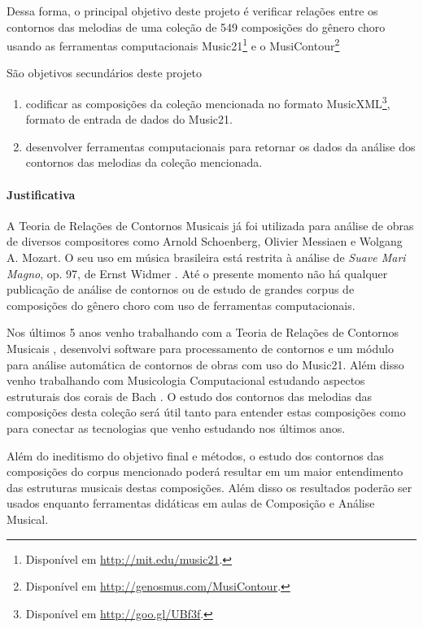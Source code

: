 \documentclass[11pt]{article}
\newcommand{\opus}[1]{\textit{#1}}
\begin{document}
Dessa forma, o principal objetivo deste projeto é verificar relações
entre os contornos das melodias de uma coleção de 549 composições do
gênero choro usando as ferramentas computacionais
Music21\footnote{Disponível em \url{http://mit.edu/music21}.} e o
MusiContour\footnote{Disponível em
  \url{http://genosmus.com/MusiContour}.}

São objetivos secundários deste projeto
\begin{enumerate}
\item codificar as composições da coleção mencionada no formato
  MusicXML\footnote{Disponível em \url{http://goo.gl/UBf3f}.}, formato
  de entrada de dados do Music21.
\item desenvolver ferramentas computacionais para retornar os dados da
  análise dos contornos das melodias da coleção mencionada.
\end{enumerate}

\paragraph{Justificativa}
\label{sec:justificativa}

A Teoria de Relações de Contornos Musicais já foi utilizada para
análise de obras de diversos compositores como Arnold Schoenberg,
Olivier Messiaen e Wolgang A. Mozart. O seu uso em música brasileira
está restrita à análise de \opus{Suave Mari Magno}, op. 97, de Ernst
Widmer \cite{Thiesen2005}. Até o presente momento não há qualquer
publicação de análise de contornos ou de estudo de grandes corpus de
composições do gênero choro com uso de ferramentas computacionais.

Nos últimos 5 anos venho trabalhando com a Teoria de Relações de
Contornos Musicais \cite{Sampaio2008}, desenvolvi software para
processamento de contornos e um módulo para análise automática de
contornos de obras com uso do Music21.
Além disso venho trabalhando com Musicologia Computacional estudando
aspectos estruturais dos corais de Bach \cite{Kroger2008}. O estudo
dos contornos das melodias das composições desta coleção será útil
tanto para entender estas composições como para conectar as
tecnologias que venho estudando nos últimos anos.

Além do ineditismo do objetivo final e métodos, o estudo dos contornos
das composições do corpus mencionado poderá resultar em um maior
entendimento das estruturas musicais destas composições. Além disso os
resultados poderão ser usados enquanto ferramentas didáticas em aulas
de Composição e Análise Musical.
\end{document}
